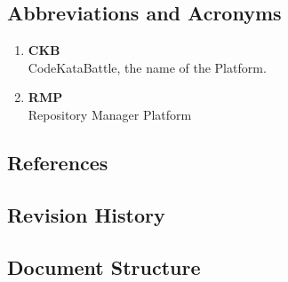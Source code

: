 \subsection{Abbreviations and Acronyms}
\begin{enumerate}[label=$\bullet$]
    \item \textbf{CKB}\\CodeKataBattle, the name of the Platform.
    \item \textbf{RMP}\\Repository Manager Platform
\end{enumerate}
\subsection{References}
\subsection{Revision History}
\subsection{Document Structure}

\newpage
%